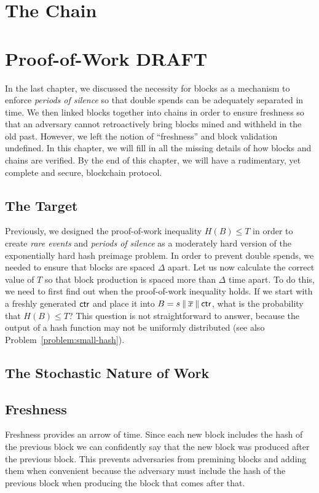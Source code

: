 \chapter{The Chain}
\chapter{Proof-of-Work \small{\textsf{DRAFT}}}\label{chapter:pow}

In the last chapter, we discussed the necessity for blocks as a mechanism to enforce \emph{periods of silence} so that double spends
can be adequately separated in time.  We then linked blocks together into chains in order to ensure freshness so that an adversary cannot
retroactively bring blocks mined and withheld in the old past. However, we left the notion of ``freshness'' and block validation
undefined. In this chapter, we will fill in all the missing details of how blocks and chains are verified. By the end of this chapter,
we will have a rudimentary, yet complete and secure, blockchain protocol.

\section{The Target}

Previously, we designed the proof-of-work inequality $H(B) \leq T$ in order to create \emph{rare events} and \emph{periods of silence}
as a moderately hard version of the exponentially hard hash preimage problem. In order to prevent double spends, we needed to ensure
that blocks are spaced $\Delta$ apart. Let us now calculate the correct value of $T$ so that block production is spaced more than
$\Delta$ time apart. To do this, we need to first find out when the proof-of-work inequality holds. If we start
with a freshly generated $\mathsf{ctr}$ and place it into $B = s \mathbin{\|} \overline{x} \mathbin{\|} \mathsf{ctr}$, what is the probability that $H(B) \leq T$?
This question is not straightforward to answer, because the output of a hash function may not be uniformly distributed (see also
Problem~\ref{problem:small-hash}).

\section{The Stochastic Nature of Work}

\section{Freshness}
Freshness provides an arrow of time. Since each new block includes the hash of the previous block we can confidently say that the new block was produced after the previous block. This prevents adversaries from premining blocks and adding them when convenient because the adversary must include the hash of the previous block when producing the block that comes after that.

